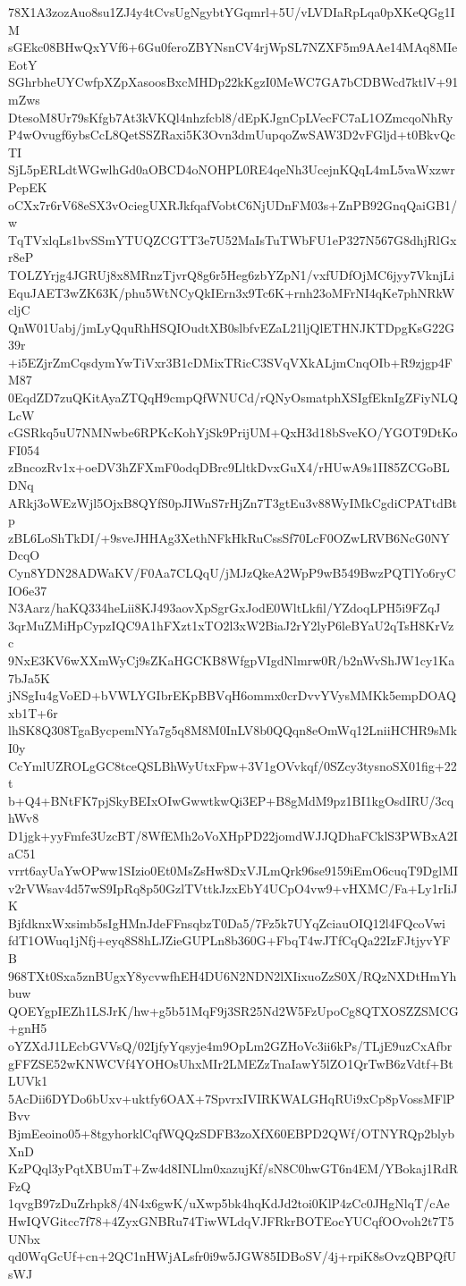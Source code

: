 78X1A3zozAuo8su1ZJ4y4tCvsUgNgybtYGqmrl+5U/vLVDIaRpLqa0pXKeQGg1IM
sGEkc08BHwQxYVf6+6Gu0feroZBYNsnCV4rjWpSL7NZXF5m9AAe14MAq8MIeEotY
SGhrbheUYCwfpXZpXasoosBxcMHDp22kKgzI0MeWC7GA7bCDBWcd7ktlV+91mZws
DtesoM8Ur79sKfgb7At3kVKQl4nhzfcbl8/dEpKJgnCpLVecFC7aL1OZmcqoNhRy
P4wOvugf6ybsCcL8QetSSZRaxi5K3Ovn3dmUupqoZwSAW3D2vFGljd+t0BkvQcTI
SjL5pERLdtWGwlhGd0aOBCD4oNOHPL0RE4qeNh3UcejnKQqL4mL5vaWxzwrPepEK
oCXx7r6rV68eSX3vOciegUXRJkfqafVobtC6NjUDnFM03s+ZnPB92GnqQaiGB1/w
TqTVxlqLs1bvSSmYTUQZCGTT3e7U52MaIsTuTWbFU1eP327N567G8dhjRlGxr8eP
TOLZYrjg4JGRUj8x8MRnzTjvrQ8g6r5Heg6zbYZpN1/vxfUDfOjMC6jyy7VknjLi
EquJAET3wZK63K/phu5WtNCyQkIErn3x9Tc6K+rnh23oMFrNI4qKe7phNRkWcljC
QnW01Uabj/jmLyQquRhHSQIOudtXB0slbfvEZaL21ljQlETHNJKTDpgKsG22G39r
+i5EZjrZmCqsdymYwTiVxr3B1cDMixTRicC3SVqVXkALjmCnqOIb+R9zjgp4FM87
0EqdZD7zuQKitAyaZTQqH9cmpQfWNUCd/rQNyOsmatphXSIgfEknIgZFiyNLQLcW
cGSRkq5uU7NMNwbe6RPKcKohYjSk9PrijUM+QxH3d18bSveKO/YGOT9DtKoFI054
zBncozRv1x+oeDV3hZFXmF0odqDBrc9LltkDvxGuX4/rHUwA9s1II85ZCGoBLDNq
ARkj3oWEzWjl5OjxB8QYfS0pJIWnS7rHjZn7T3gtEu3v88WyIMkCgdiCPATtdBtp
zBL6LoShTkDI/+9sveJHHAg3XethNFkHkRuCssSf70LcF0OZwLRVB6NcG0NYDcqO
Cyn8YDN28ADWaKV/F0Aa7CLQqU/jMJzQkeA2WpP9wB549BwzPQTlYo6ryCIO6e37
N3Aarz/haKQ334heLii8KJ493aovXpSgrGxJodE0WltLkfil/YZdoqLPH5i9FZqJ
3qrMuZMiHpCypzIQC9A1hFXzt1xTO2l3xW2BiaJ2rY2lyP6leBYaU2qTsH8KrVzc
9NxE3KV6wXXmWyCj9sZKaHGCKB8WfgpVIgdNlmrw0R/b2nWvShJW1cy1Ka7bJa5K
jNSgIu4gVoED+bVWLYGIbrEKpBBVqH6ommx0crDvvYVysMMKk5empDOAQxb1T+6r
lhSK8Q308TgaBycpemNYa7g5q8M8M0InLV8b0QQqn8eOmWq12LniiHCHR9sMkI0y
CcYmlUZROLgGC8tceQSLBhWyUtxFpw+3V1gOVvkqf/0SZcy3tysnoSX01fig+22t
b+Q4+BNtFK7pjSkyBEIxOIwGwwtkwQi3EP+B8gMdM9pz1BI1kgOsdIRU/3cqhWv8
D1jgk+yyFmfe3UzcBT/8WfEMh2oVoXHpPD22jomdWJJQDhaFCklS3PWBxA2IaC51
vrrt6ayUaYwOPww1SIzio0Et0MsZsHw8DxVJLmQrk96se9159iEmO6cuqT9DglMI
v2rVWsav4d57wS9IpRq8p50GzlTVttkJzxEbY4UCpO4vw9+vHXMC/Fa+Ly1rIiJK
BjfdknxWxsimb5sIgHMnJdeFFnsqbzT0Da5/7Fz5k7UYqZciauOIQ12l4FQcoVwi
fdT1OWuq1jNfj+eyq8S8hLJZieGUPLn8b360G+FbqT4wJTfCqQa22IzFJtjyvYFB
968TXt0Sxa5znBUgxY8ycvwfhEH4DU6N2NDN2lXIixuoZzS0X/RQzNXDtHmYhbuw
QOEYgpIEZh1LSJrK/hw+g5b51MqF9j3SR25Nd2W5FzUpoCg8QTXOSZZSMCG+gnH5
oYZXdJ1LEcbGVVsQ/02IjfyYqsyje4m9OpLm2GZHoVc3ii6kPs/TLjE9uzCxAfbr
gFFZSE52wKNWCVf4YOHOsUhxMIr2LMEZzTnaIawY5lZO1QrTwB6zVdtf+BtLUVk1
5AcDii6DYDo6bUxv+uktfy6OAX+7SpvrxIVIRKWALGHqRUi9xCp8pVossMFlPBvv
BjmEeoino05+8tgyhorklCqfWQQzSDFB3zoXfX60EBPD2QWf/OTNYRQp2blybXnD
KzPQql3yPqtXBUmT+Zw4d8INLlm0xazujKf/sN8C0hwGT6n4EM/YBokaj1RdRFzQ
1qvgB97zDuZrhpk8/4N4x6gwK/uXwp5bk4hqKdJd2toi0KlP4zCc0JHgNlqT/cAe
HwIQVGitcc7f78+4ZyxGNBRu74TiwWLdqVJFRkrBOTEocYUCqfOOvoh2t7T5UNbx
qd0WqGcUf+cn+2QC1nHWjALsfr0i9w5JGW85IDBoSV/4j+rpiK8sOvzQBPQfUsWJ

